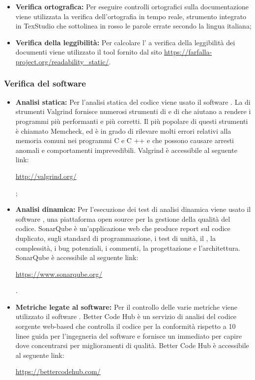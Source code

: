 \documentclass[../NormediProgetto.tex]{subfiles}
\begin{document}
\begin{itemize}
    \item \textbf{Verifica ortografica:} Per eseguire controlli ortografici sulla documentazione viene utilizzata la verifica dell’ortografia in tempo reale, strumento integrato in TexStudio che sottolinea in rosso le parole errate secondo la lingua italiana;
    
    \item \textbf{Verifica della leggibilità:} Per calcolare l' a verifica della leggibilità dei documenti viene utilizzato il tool fornito dal sito \url{https://farfalla-project.org/readability_static/}.
\end{itemize}

\subsubsection{Verifica del software}

\begin{itemize}
    \item \textbf{Analisi statica:} Per l’analisi statica del codice viene usato il software . La  di strumenti Valgrind fornisce numerosi strumenti di  e di  che aiutano a rendere i programmi più performanti e più corretti. Il più popolare di questi strumenti è chiamato Memcheck, ed è in grado di rilevare molti errori relativi alla memoria comuni nei programmi C e C ++ e che possono causare arresti anomali e comportamenti imprevedibili. Valgrind è accessibile al seguente link: \\ \centerline{\url{http://valgrind.org/}};

    \item \textbf{Analisi dinamica:} Per l’esecuzione dei test di analisi dinamica viene usato il software , una piattaforma open source per la gestione della qualità del codice. SonarQube è un’applicazione web che produce report sul codice duplicato, sugli standard di programmazione, i test di unità, il , la complessità, i bug potenziali, i commenti, la progettazione e l’architettura. SonarQube è accessibile al seguente link: \\ \centerline{\url{https://www.sonarqube.org/}}.
    
    \item \textbf{Metriche legate al software:} Per il controllo delle varie metriche viene utilizzato il software . Better Code Hub è un servizio di analisi del codice sorgente web-based che controlla il codice per la conformità rispetto a 10 linee guida per l'ingegneria del software e fornisce un  immediato per capire dove concentrarsi per miglioramenti di qualità. Better Code Hub è accessibile al seguente link:\\ \centerline{\url{https://bettercodehub.com/}}
\end{itemize}
    
\end{document}
